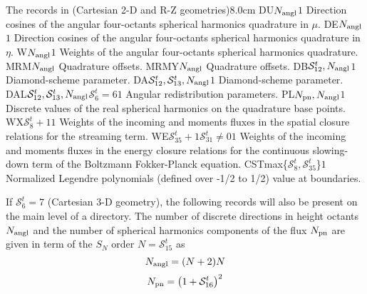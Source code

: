 \begin{DescriptionEnregistrement}{The  records in
 (Cartesian 2-D and R-Z geometries)}{8.0cm}
\RealEnr
  {DU}{$N_{\rm angl}$}{$1$}
  {Direction cosines of the angular four-octants spherical harmonics quadrature in $\mu$.} 
\RealEnr
  {DE}{$N_{\rm angl}$}{$1$}
  {Direction cosines of the angular four-octants spherical harmonics quadrature in $\eta$.} 
\RealEnr
  {W}{$N_{\rm angl}$}{$1$}
  {Weights of the angular four-octants spherical harmonics quadrature.} 
\IntEnr
  {MRM}{$N_{\rm angl}$}
  {Quadrature offsets.} 
\IntEnr
  {MRMY}{$N_{\rm angl}$}
  {Quadrature offsets.} 
\RealEnr
  {DB}{$\mathcal{S}^{t}_{12},N_{\rm angl}$}{$1$}
  {Diamond-scheme parameter.} 
\RealEnr
  {DA}{$\mathcal{S}^{t}_{12},\mathcal{S}^{t}_{13},N_{\rm angl}$}{$1$}
  {Diamond-scheme parameter.} 
\OptRealEnr
  {DAL}{$\mathcal{S}^{t}_{12},\mathcal{S}^{t}_{13},N_{\rm angl}$}{$\mathcal{S}^{t}_{6}=6$}{$1$}
  {Angular redistribution parameters.} 
\RealEnr
  {PL}{$N_{\rm pn},N_{\rm angl}$}{$1$}
  {Discrete values of the real spherical harmonics on the quadrature base points.} 
\RealEnr
  {WX}{$\mathcal{S}^{t}_{8}+1$}{$1$}
  {Weights of the incoming and moments fluxes in the spatial closure relations for the streaming term.}
\OptRealEnr
  {WE}{$\mathcal{S}^{t}_{35}+1$}{$\mathcal{S}^{t}_{31}\neq0$}{$1$}
  {Weights of the incoming and moments fluxes in the energy closure relations for the continuous slowing-down term of the Boltzmann Fokker-Planck equation.}
\RealEnr
  {CST}{max\{$\mathcal{S}^{t}_{8},\mathcal{S}^{t}_{35}$\}}{$1$}
  {Normalized Legendre polynomials (defined over -1/2 to 1/2) value at boundaries.}
\end{DescriptionEnregistrement}

If $\mathcal{S}^{t}_{6}=7$ (Cartesian 3-D geometry), the following records will also be present on the main level of a 
directory. The number of discrete directions in height octants  $N_{\rm angl}$ and the number of spherical harmonics components of the flux $N_{\rm pn}$
are given in term of the $S_N$ order $N=\mathcal{S}^{t}_{15}$ as
$$
N_{\rm angl}=(N+2)N
$$
$$
N_{\rm pn}=\left( 1+\mathcal{S}^{t}_{16}\right)^{2}
$$


